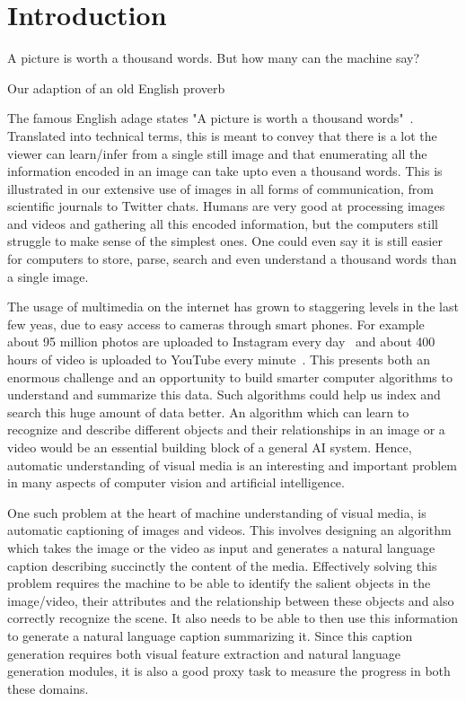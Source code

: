 \chapter{Introduction}
\label{chapter:intro}
\setlength{\epigraphwidth}{\textwidth}
\epigraph{A picture is worth a thousand words. But how many can the machine
say?}{Our adaption of an old English proverb}

The famous English adage states "A picture is worth a thousand
words"~\cite{ThousandQuote}.
Translated into technical terms, this is meant to convey that there is a lot the
viewer can learn/infer from a single still image and that enumerating all the
information encoded in an image can take upto even a thousand words.
This is illustrated in our extensive use of images in all forms of
communication, from scientific journals to Twitter chats. 
%
Humans are very good at processing images and videos and gathering all this
encoded information, but the computers still struggle to make sense of the
simplest ones.
%
One could even say it is still easier for computers to store, parse, search and
even understand a thousand words than a single image.
%

The usage of multimedia on the internet has grown to staggering levels in the
last few yeas, due to easy access to cameras through smart phones.
For example about 95 million photos are uploaded to Instagram every
day~\cite{InstStats} and about 400 hours of video is uploaded to YouTube every
minute~\cite{YouStats}.
This presents both an enormous challenge and an opportunity to build smarter
computer algorithms to understand and summarize this data.
Such algorithms could help us index and search this huge amount of data better.
An algorithm which can learn to recognize and describe different objects and
their relationships in an image or a video would be an essential building block
of a general AI system.
Hence, automatic understanding of visual media is an interesting and important
problem in many aspects of computer vision and artificial intelligence.
%

One such problem at the heart of machine understanding of visual media, is
automatic captioning of images and videos.
This involves designing an algorithm which takes the image or the video as input
and generates a natural language caption describing succinctly the content of
the media.
Effectively solving this problem requires the machine to be able to identify the
salient objects in the image/video, their attributes and the relationship
between these objects and also correctly recognize the scene.
It also needs to be able to then use this information to generate a natural language
caption summarizing it.
Since this caption generation requires both visual feature extraction and natural
language generation modules, it is also a good proxy task to measure the
progress in both these domains. 

